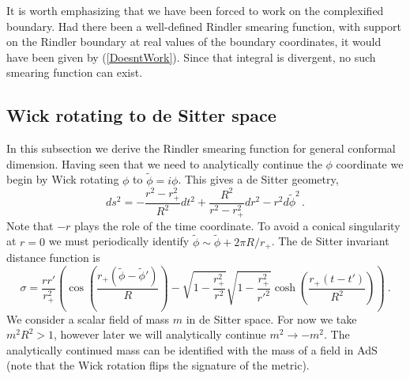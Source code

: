 \documentclass[12pt]{article}
\begin{document}
It is worth emphasizing that we have been forced to work on the complexified
boundary.  Had there been a well-defined Rindler smearing function, with support on
the Rindler boundary at real values of the boundary coordinates, it would have been
given by (\ref{DoesntWork}).  Since that integral is divergent, no such smearing
function can exist.

\subsection{Wick rotating to de Sitter space} \label{cgeom}

In this subsection we derive the Rindler smearing function for general
conformal dimension.  Having seen that we need to analytically
continue the $\phi$ coordinate we begin by Wick rotating $\phi$ to
$\tilde \phi=i\phi$.  This gives a de Sitter geometry,
\[
ds^{2}=-\frac{r^{2}-r_{+}^{2}}{R^{2}}dt^{2}+\frac{R^{2}}{r^{2}-r_{+}^{2}}dr^{2}-r^{2}d\tilde{\phi}^{2}\,.
\]
Note that $-r$ plays the role of the time coordinate.  To avoid a
conical singularity at $r = 0$ we must periodically identify $\tilde
\phi\sim \tilde \phi +2 \pi R/r_+$.  The de Sitter invariant distance
function is
\[
\sigma=\frac{rr'}{r_{+}^{2}}\left(\cos\left(\frac{r_+(\tilde{\phi}-\tilde{\phi}')}{R}\right)-\sqrt{1-\frac{r_{+}^{2}}{r^{2}}}
\sqrt{1-\frac{r_{+}^{2}}{r'^{2}}}\cosh\left(\frac{r_+(t-t')}{R^2}\right)\right)~.
\]
We consider a scalar field of mass $m$ in de Sitter space.  For now we
take $m^2 R^2>1$, however later we will analytically continue $m^2 \to
- m^2$.  The analytically continued mass can be identified with the
mass of a field in AdS (note that the Wick rotation flips the
signature of the metric).
\end{document}
